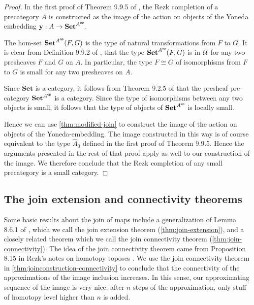\begin{proof}
In the first proof of Theorem 9.9.5 of \cite{hottbook}, the Rezk completion of
a precategory $A$ is constructed as the image of the action on objects of the
Yoneda embedding $\mathbf{y}:A\to\mathbf{Set}^{{{A}^\mathsf{op}}}$.

The hom-set $\mathbf{Set}^{{{A}^\mathsf{op}}}(F,G)$ is the type of natural transformations
from $F$ to $G$. It is clear from Definition 9.9.2 of \cite{hottbook}, that the
type $\mathbf{Set}^{{{A}^\mathsf{op}}}(F,G)$ is in $\mathcal{U}$ for any two presheaves $F$ and $G$
on $A$. In particular, the type $F\cong G$ of isomorphisms from $F$ to $G$
is small for any two presheaves on $A$.

Since $\mathbf{Set}$ is a category, it follows from Theorem 9.2.5 of
\cite{hottbook} that the presheaf pre-category $\mathbf{Set}^{{{A}^\mathsf{op}}}$ is a category.
Since the type of isomorphisms between any two objects is
small, it follows that the type of objects of
$\mathbf{Set}^{{{A}^\mathsf{op}}}$ is locally small. 

Hence we can use \autoref{thm:modified-join} to construct the image of the
action on objects of the Yoneda-embedding. The image constructed in this way
is of course equivalent to the type $\hat{A}_0$ defined in the first proof of
Theorem 9.9.5. Hence the arguments presented in the rest of that proof apply
as well to our construction of the image. We therefore conclude that the Rezk completion
of any small precategory is a small category.
\end{proof}

\subsection{The join extension and connectivity theorems}

Some basic results about the join of maps include a generalization of Lemma 8.6.1 of
\cite{hottbook}, which we call the join extension theorem (\autoref{thm:join-extension}), and a closely
related theorem which we call the join connectivity theorem (\autoref{thm:join-connectivity}).
The idea of the join connectivity theorem came from Proposition 8.15 in 
Rezk's notes on homotopy toposes \cite{Rezk}.
We use the join connectivity theorem in 
\autoref{thm:joinconstruction-connectivity} to conclude that the connectivity 
of the approximations of the image inclusion increases.
In this sense, our approximating sequence of the image is very nice:
after $n$ steps of the approximation, only stuff of homotopy level higher than
$n$ is added.

